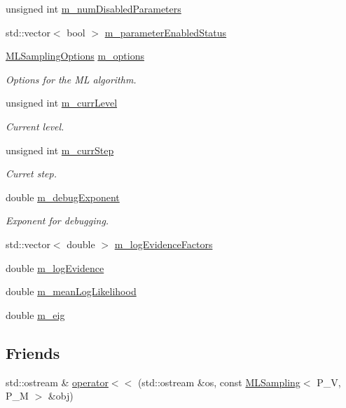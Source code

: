 \begin{DoxyCompactItemize}
unsigned int \hyperlink{class_q_u_e_s_o_1_1_m_l_sampling_afbe27e6149562020663b72da6592d933}{m\-\_\-num\-Disabled\-Parameters}
\item 
std\-::vector$<$ bool $>$ \hyperlink{class_q_u_e_s_o_1_1_m_l_sampling_ac76690384f70d74b8662faf7a051449e}{m\-\_\-parameter\-Enabled\-Status}
\item 
\hyperlink{class_q_u_e_s_o_1_1_m_l_sampling_options}{M\-L\-Sampling\-Options} \hyperlink{class_q_u_e_s_o_1_1_m_l_sampling_af8504cc57ec72b3c52833826b2bfff8e}{m\-\_\-options}
\begin{DoxyCompactList}\small\item\em Options for the M\-L algorithm. \end{DoxyCompactList}\item 
unsigned int \hyperlink{class_q_u_e_s_o_1_1_m_l_sampling_af9416874c856e50f3b35270e801f17e4}{m\-\_\-curr\-Level}
\begin{DoxyCompactList}\small\item\em Current level. \end{DoxyCompactList}\item 
unsigned int \hyperlink{class_q_u_e_s_o_1_1_m_l_sampling_a1b1f8ccb4823bdfa26ec652f0807c63e}{m\-\_\-curr\-Step}
\begin{DoxyCompactList}\small\item\em Curret step. \end{DoxyCompactList}\item 
double \hyperlink{class_q_u_e_s_o_1_1_m_l_sampling_abdd5cd35419283c33cc40a77d0f4f07f}{m\-\_\-debug\-Exponent}
\begin{DoxyCompactList}\small\item\em Exponent for debugging. \end{DoxyCompactList}\item 
std\-::vector$<$ double $>$ \hyperlink{class_q_u_e_s_o_1_1_m_l_sampling_a75f2ceab4a2c6774b3fa07d74221dbf3}{m\-\_\-log\-Evidence\-Factors}
\item 
double \hyperlink{class_q_u_e_s_o_1_1_m_l_sampling_afad63c42dccb1518319bf677f2bffde0}{m\-\_\-log\-Evidence}
\item 
double \hyperlink{class_q_u_e_s_o_1_1_m_l_sampling_aec4229773274b58e3eaa49a77738389f}{m\-\_\-mean\-Log\-Likelihood}
\item 
double \hyperlink{class_q_u_e_s_o_1_1_m_l_sampling_abec7f8cf9da08bc5c0a20d99fa4570af}{m\-\_\-eig}
\end{DoxyCompactItemize}
\subsection*{Friends}
\begin{DoxyCompactItemize}
\item 
std\-::ostream \& \hyperlink{class_q_u_e_s_o_1_1_m_l_sampling_a5a8aa9e185dfa1698ec94d6709895d2c}{operator$<$$<$} (std\-::ostream \&os, const \hyperlink{class_q_u_e_s_o_1_1_m_l_sampling}{M\-L\-Sampling}$<$ P\-\_\-\-V, P\-\_\-\-M $>$ \&obj)
\end{DoxyCompactItemize}


